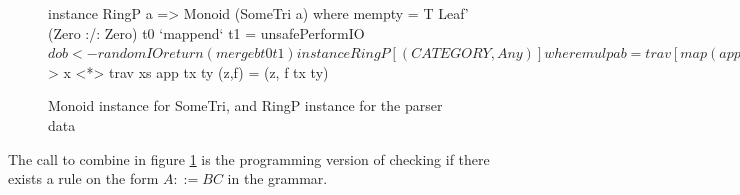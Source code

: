 \documentclass[a4paper,12pt,twosided]{report}
\begin{document}
\begin{figure}[H]
\begin{code}
instance RingP a => Monoid (SomeTri a) where
    mempty = T Leaf' (Zero :/: Zero)
    t0 `mappend` t1 = unsafePerformIO $ do
      b <- randomIO
      return (merge b t0 t1)

instance RingP [(CATEGORY,Any)] where
  mul p a b = trav [map (app tx ty) l :/: map (app tx ty) r 
                   | (x,tx) <- a, (y,ty) <- b
                   , let l:/:r = combine p x y]
    where trav :: [Pair [a]] -> Pair [a]
          trav [] = pure []
          trav (x:xs) = (++) <$> x <*> trav xs
          app tx ty (z,f)  = (z, f tx ty)
\end{code}
\caption{\label{parsemonoid}Monoid instance for SomeTri, and RingP instance for
the parser data}
\end{figure}
The call to combine in figure \ref{parsemonoid} is the programming version of
checking if there exists a rule on the form $A ::= BC$ in the grammar.
\end{document}
